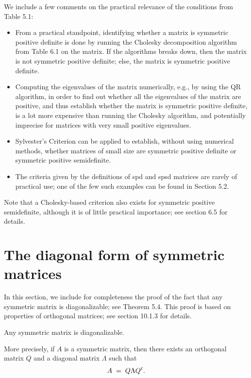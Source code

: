 We include a few comments on the practical relevance of the conditions from
Table 5.1:

\begin{itemize}
\item From a practical standpoint, identifying whether a matrix is symmetric
positive definite is done by running the Cholesky decomposition algorithm from
Table 6.1 on the matrix. If the algorithms breaks down, then the matrix is not
symmetric positive definite; else, the matrix is symmetric positive definite.

\item Computing the eigenvalues of the matrix numerically, e.g., by using the QR
algorithm, in order to find out whether all the eigenvalues of the matrix are
positive, and thus establish whether the matrix is symmetric positive definite, is a
lot more expensive than running the Cholesky algorithm, and potentially imprecise
for matrices with very small positive eigenvalues.

\item Sylvester's Criterion can be applied to establish, without using numerical
methods, whether matrices of small size are symmetric positive definite or symmetric
positive semidefinite.

\item The criteria given by the definitions of spd and spsd matrices are rarely of
practical use; one of the few such examples can be found in Section 5.2.
\end{itemize}

Note that a Cholesky-based criterion also exists for symmetric positive
semidefinite, although it is of little practical importance; see section 6.5 for
details.

\section{The diagonal form of symmetric matrices}

In this section, we include for completeness the proof of the fact that any
symmetric matrix is diagonalizable; see Theorem 5.4. This proof is based on
properties of orthogonal matrices; see section 10.1.3 for details.

\begin{theorem}
Any symmetric matrix is diagonalizable.

More precisely, if $A$ is a symmetric matrix, then there exists an orthogonal matrix
$Q$ and a diagonal matrix $\Lambda$ such that
\begin{equation}
A \;=\; Q\Lambda Q^{t}.
\end{equation}
\end{theorem}

